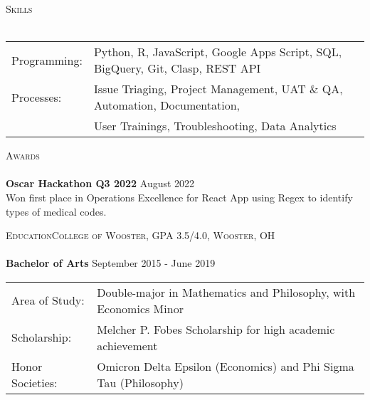 \documentclass[a4paper]{article}
\newcommand{\lineunder} {
    \vspace*{-8pt} \\
    \hspace*{-18pt} \hrulefill \\
}
\newcommand{\header} [1] {
    {\hspace*{-18pt}\vspace*{6pt} \textsc{#1}}
    \vspace*{-6pt} \lineunder
}
\begin{document}
\header{Skills}
\begin{tabular}{ l l }
	Programming:    &   Python, R, JavaScript, Google Apps Script, SQL, BigQuery, Git, Clasp, REST API\\
    Processes:      &   Issue Triaging, Project Management, UAT \& QA, Automation, Documentation,\\ 
                    &   User Trainings, Troubleshooting,  Data Analytics
\end{tabular}
\vspace{2mm}


\header{Awards}
\textbf{Oscar Hackathon Q3 2022} \hfill August 2022\\
Won first place in Operations Excellence for React App using Regex to identify types of medical codes. 
\vspace*{2mm}

\header{Education\hfill College of Wooster, GPA 3.5/4.0, Wooster, OH}
\textbf{Bachelor of Arts} \hfill September 2015 - June 2019\\
\begin{tabular}{ l| l }
    Area of Study:& Double-major in Mathematics and Philosophy, with Economics Minor\\
    Scholarship:& Melcher P. Fobes Scholarship for high academic achievement\\
    Honor Societies:& Omicron Delta Epsilon (Economics) and Phi Sigma Tau (Philosophy)

\end{tabular}

\vspace*{2mm}
\end{document}
